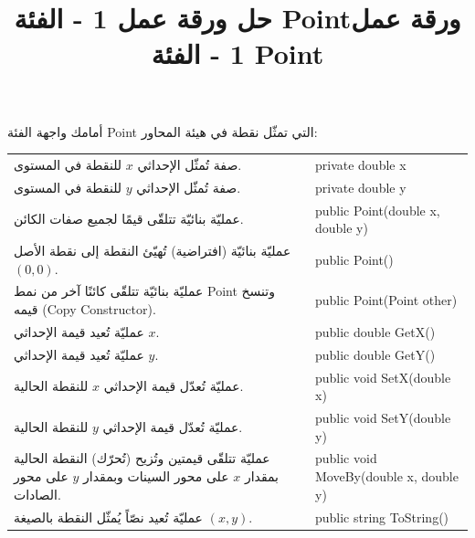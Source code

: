 \documentclass[14pt]{extarticle}
\title{حل ورقة عمل 1 - الفئة \textenglish{Point}}
\title{ورقة عمل 1 - الفئة \textenglish{Point}}
\begin{document}
\maketitle


أمامك واجهة الفئة \textenglish{Point} التي تمثّل نقطة في هيئة المحاور:

{\centering
\renewcommand{\arraystretch}{1.2}
\small
\begin{tabular}{|>{\raggedleft\arraybackslash}p{}|>{\raggedright\arraybackslash}p{}|}
\hline
\multicolumn{2}{|c|}{\textbf{الفئة: \textenglish{Point}}} \\
\hline
صفة تُمثّل الإحداثي $x$ للنقطة في المستوى. & \textenglish{private double x} \\
\hline
صفة تُمثّل الإحداثي $y$ للنقطة في المستوى. & \textenglish{private double y} \\
\hline
عمليّة بنائيّة تتلقّى قيمًا لجميع صفات الكائن. & \textenglish{public Point(double x, double y)} \\
\hline
عمليّة بنائيّة (افتراضية) تُهيّئ النقطة إلى نقطة الأصل $(0,0)$. & \textenglish{public Point()} \\
\hline
عمليّة بنائيّة تتلقّى كائنًا آخر من نمط \textenglish{Point} وتنسخ قيمه (Copy Constructor). & \textenglish{public Point(Point other)} \\
\hline
عمليّة تُعيد قيمة الإحداثي $x$. & \textenglish{public double GetX()} \\
\hline
عمليّة تُعيد قيمة الإحداثي $y$. & \textenglish{public double GetY()} \\
\hline
عمليّة تُعدّل قيمة الإحداثي $x$ للنقطة الحالية. & \textenglish{public void SetX(double x)} \\
\hline
عمليّة تُعدّل قيمة الإحداثي $y$ للنقطة الحالية. & \textenglish{public void SetY(double y)} \\
\hline
عمليّة تتلقّى قيمتين وتُزيح (تُحرّك) النقطة الحالية بمقدار $x$ على محور السينات وبمقدار $y$ على محور الصادات. & \textenglish{public void MoveBy(double x, double y)} \\
\hline
عمليّة تُعيد نصّاً يُمثّل النقطة بالصيغة $(x, y)$. & \textenglish{public string ToString()} \\
\hline
\end{tabular}
\par} %

\vspace{2em}

\clearpage
\end{document}
